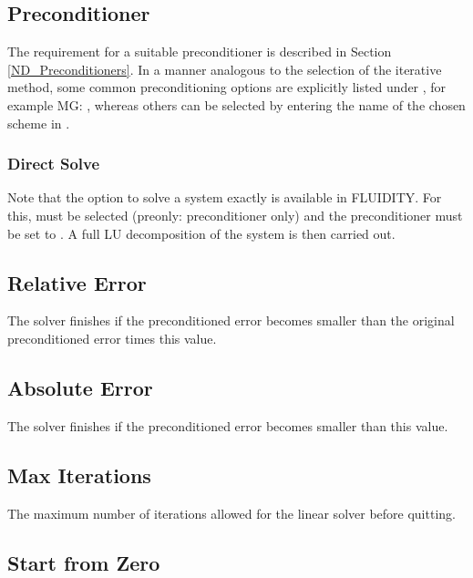 \subsection{Preconditioner}

The requirement for a suitable preconditioner is described in Section \ref{ND_Preconditioners}. In a manner analogous to the selection of the iterative method, some common preconditioning options are explicitly listed under , for example MG: , whereas others can be selected by entering the name of the chosen scheme in . 

\subsubsection{Direct Solve}

Note that the option to solve a system exactly is available in FLUIDITY. For this,  must be selected (preonly: preconditioner only) and the preconditioner must be set to . A full LU decomposition of the system is then carried out.

\subsection{Relative Error}

The solver finishes if the preconditioned error becomes smaller than the original preconditioned error times this value. 

\subsection{Absolute Error}

The solver finishes if the preconditioned error becomes smaller than this value.

\subsection{Max Iterations}

The maximum number of iterations allowed for the linear solver before quitting.

\subsection{Start from Zero}

